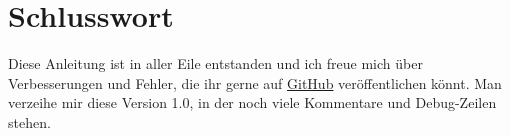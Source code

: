 \chapter{Schlusswort}
Diese Anleitung ist in aller Eile entstanden und ich freue mich über Verbesserungen und Fehler, die ihr gerne auf \href{https://github.com/Jabaal/thesis-tex}{GitHub} veröffentlichen könnt. Man verzeihe mir diese Version 1.0, in der noch viele Kommentare und Debug-Zeilen stehen.